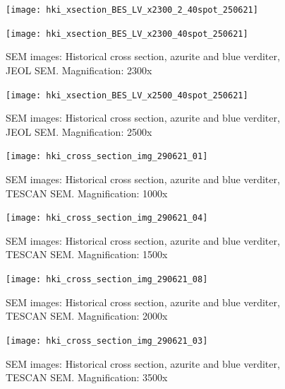 \begin{figure}[H]
\centering
\begin{minipage}{.45\textwidth}
  \centering
  \texttt{[image: hki\_xsection\_BES\_LV\_x2300\_2\_40spot\_250621]}
\end{minipage}
\begin{minipage}{.45\textwidth}
  \centering
  \texttt{[image: hki\_xsection\_BES\_LV\_x2300\_40spot\_250621]}
\end{minipage}
\caption[SEM images: Historical cross section, azurite and blue verditer]{SEM images: Historical cross section, azurite and blue verditer, JEOL SEM. Magnification: 2300x}
\label{fig:xsection_jeol_7}
\end{figure}

\begin{figure}[H]
\centering
  \texttt{[image: hki\_xsection\_BES\_LV\_x2500\_40spot\_250621]}
\caption[SEM images: Historical cross section, azurite and blue verditer]{SEM images: Historical cross section, azurite and blue verditer, JEOL SEM. Magnification: 2500x}
\label{fig:xsection_jeol_8}
\end{figure}


\begin{figure}[H]
\centering
  \texttt{[image: hki\_cross\_section\_img\_290621\_01]}
\caption[SEM images: Historical cross section, azurite and blue verditer]{SEM images: Historical cross section, azurite and blue verditer, TESCAN SEM. Magnification: 1000x}
\label{fig:xsection_dept_3}
\end{figure}

\begin{figure}[H]
\centering
  \texttt{[image: hki\_cross\_section\_img\_290621\_04]}
\caption[SEM images: Historical cross section, azurite and blue verditer]{SEM images: Historical cross section, azurite and blue verditer, TESCAN SEM. Magnification: 1500x}
\label{fig:xsection_dept_4}
\end{figure}


\begin{figure}[H]
\centering
  \texttt{[image: hki\_cross\_section\_img\_290621\_08]}
\caption[SEM images: Historical cross section, azurite and blue verditer]{SEM images: Historical cross section, azurite and blue verditer, TESCAN SEM. Magnification: 2000x}
\label{fig:xsection_dept_5}
\end{figure}

\begin{figure}[H]
\centering
  \texttt{[image: hki\_cross\_section\_img\_290621\_03]}
\caption[SEM images: Historical cross section, azurite and blue verditer]{SEM images: Historical cross section, azurite and blue verditer, TESCAN SEM. Magnification: 3500x}
\label{fig:xsection_dept_6}
\end{figure}

